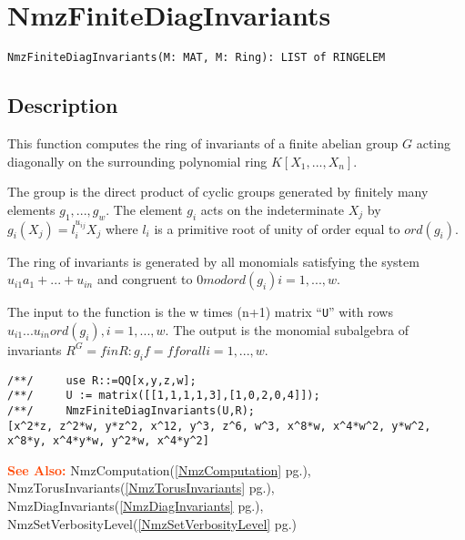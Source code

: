 \documentclass[a4paper]{mybook}
\newenvironment{command}{}{} %
\newcommand\SeeAlso{\par\textcolor{OrangeRed}{\textbf{\large See Also: }}}
\begin{document}
\section{NmzFiniteDiagInvariants}
\label{NmzFiniteDiagInvariants}
\begin{command} %


\begin{Verbatim}[label=syntax, rulecolor=\color{MidnightBlue},
frame=single]
NmzFiniteDiagInvariants(M: MAT, M: Ring): LIST of RINGELEM
\end{Verbatim}


\subsection*{Description}

This function computes the ring of invariants of a finite abelian
group $G$ acting diagonally on the surrounding polynomial
ring $K[X_1,...,X_n]$.
\par 
The group is the direct product of cyclic groups generated by finitely
many elements $g_1,...,g_w$.  The element $g_i$ acts on the
indeterminate $X_j$ by $g_i(X_j)= l_i^{u_{ij}} X_j$ where $l_i$
is a primitive root of unity of order equal to $ord(g_i)$.
\par 
The ring of invariants is generated by all monomials satisfying the
system $u_{i1} a_1+...+u_{in}$ and congruent
to $0 mod ord(g_i) i=1,...,w$.
\par 
The input to the function is the w times (n+1) matrix
``\verb&U&'' with rows $u_{i1} ...u_{in} ord(g_i), i=1,...,w$.
The output is the monomial subalgebra of invariants
$R^G = {f in R : g_i f = f for all i=1,...,w}$.
\begin{Verbatim}[label=example, rulecolor=\color{PineGreen}, frame=single]
/**/     use R::=QQ[x,y,z,w];
/**/     U := matrix([[1,1,1,1,3],[1,0,2,0,4]]);
/**/     NmzFiniteDiagInvariants(U,R);
[x^2*z, z^2*w, y*z^2, x^12, y^3, z^6, w^3, x^8*w, x^4*w^2, y*w^2, x^8*y, x^4*y*w, y^2*w, x^4*y^2]
\end{Verbatim}


\SeeAlso %
  NmzComputation(\ref{NmzComputation} pg.\pageref{NmzComputation}), 
    NmzTorusInvariants(\ref{NmzTorusInvariants} pg.\pageref{NmzTorusInvariants}), 
    NmzDiagInvariants(\ref{NmzDiagInvariants} pg.\pageref{NmzDiagInvariants}), 
    NmzSetVerbosityLevel(\ref{NmzSetVerbosityLevel} pg.\pageref{NmzSetVerbosityLevel})
\end{command} %
\end{document}
